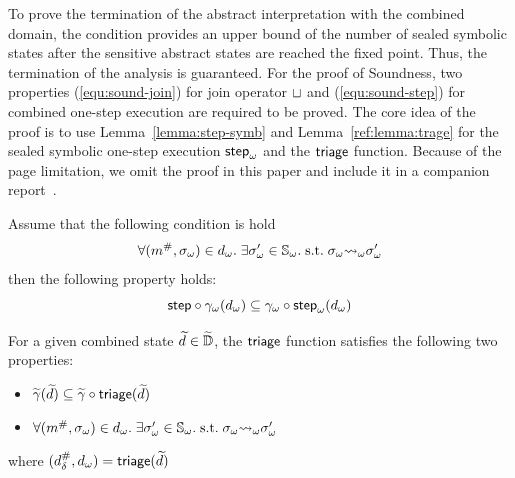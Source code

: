 To prove the termination of the abstract interpretation with the combined
domain, the condition provides an upper bound of the number of sealed symbolic
states after the sensitive abstract states are reached the fixed point.  Thus,
the termination of the analysis is guaranteed.  For the proof of Soundness, two
properties (\ref{equ:sound-join}) for join operator $\sqcup$ and
(\ref{equ:sound-step}) for combined one-step execution are required to be
proved.  The core idea of the proof is to use Lemma~\ref{lemma:step-symb} and
Lemma~\ref{ref:lemma:trage} for the sealed symbolic one-step execution
${\textsf{step}}_\omega$ and the $\textsf{triage}$ function. Because of the page limitation, we omit
the proof in this paper and include it in a companion report~\cite{report}.
\begin{lemma}\label{lemma:step-symb}
  Assume that the following condition is hold
  \[
    \forall ({m}^{\#}, {\sigma}_\omega) \in {d}_\omega. \; \exists {\sigma}_\omega' \in
    {\mathbb{S}}_\omega. \; \text{s.t.} \; {\sigma}_\omega {\leadsto}_\omega {\sigma}_\omega'
  \]
  then the following property holds:
  \[
    \textsf{step} \circ {\gamma}_\omega({d}_\omega) \subseteq
    {\gamma}_\omega \circ {\textsf{step}}_\omega({d}_\omega)\\
  \]
\end{lemma}
\begin{lemma}\label{lemma:triage}
  For a given combined state $\widetilde{d} \in \widetilde{\mathbb{D}}$, the $\textsf{triage}$ function
  satisfies the following two properties:
  \begin{itemize}
    \item $\widetilde{\gamma}(\widetilde{d}) \subseteq \widetilde{\gamma} \circ \textsf{triage}(\widetilde{d})$
    \item $\forall ({m}^{\#}, {\sigma}_\omega) \in {d}_\omega. \; \exists {\sigma}_\omega' \in
      {\mathbb{S}}_\omega.  \; \text{s.t.} \; {\sigma}_\omega {\leadsto}_\omega {\sigma}_\omega'$
  \end{itemize}
  where $({{d}^{\#}_\delta}, {d}_\omega) = \textsf{triage}(\widetilde{d})$
\end{lemma}
